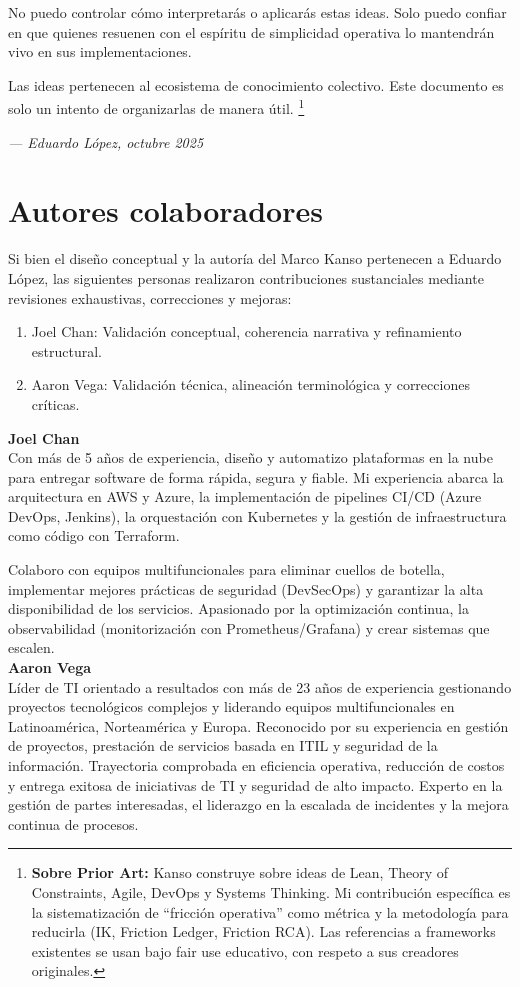 No puedo controlar cómo interpretarás o aplicarás estas ideas. Solo puedo confiar en que quienes resuenen con el espíritu de simplicidad operativa lo mantendrán vivo en sus implementaciones.

Las ideas pertenecen al ecosistema de conocimiento colectivo. Este documento es solo un intento de organizarlas de manera útil.
\footnote{%
\textbf{Sobre Prior Art:} Kanso construye sobre ideas de Lean, Theory of Constraints, 
Agile, DevOps y Systems Thinking. Mi contribución específica es la sistematización de 
``fricción operativa'' como métrica y la metodología para reducirla (IK, Friction Ledger, 
Friction RCA). Las referencias a frameworks existentes se usan bajo fair use educativo, 
con respeto a sus creadores originales.
}


\begin{flushright}
\textit{— Eduardo López, octubre 2025}
\end{flushright}


\section{Autores colaboradores}
Si bien el diseño conceptual y la autoría del Marco Kanso pertenecen a Eduardo López, las siguientes personas realizaron contribuciones sustanciales mediante revisiones exhaustivas, correcciones y mejoras:

\begin{enumerate}
    \item Joel Chan: Validación conceptual, coherencia narrativa y refinamiento estructural.
    \item Aaron Vega: Validación técnica, alineación terminológica y correcciones críticas.
\end{enumerate}

\textbf{Joel Chan}\\
Con más de 5 años de experiencia, diseño y automatizo plataformas en la nube para entregar software de forma rápida, 
segura y fiable. Mi experiencia abarca la arquitectura en AWS y Azure, la implementación de pipelines CI/CD 
(Azure DevOps, Jenkins), la orquestación con Kubernetes y la gestión de infraestructura como código con Terraform.

Colaboro con equipos multifuncionales para eliminar cuellos de botella, implementar mejores prácticas de seguridad 
(DevSecOps) y garantizar la alta disponibilidad de los servicios. Apasionado por la optimización continua, 
la observabilidad (monitorización con Prometheus/Grafana) y crear sistemas que escalen.
\\

\textbf{Aaron Vega}\\
Líder de TI orientado a resultados con más de 23 años de experiencia gestionando proyectos tecnológicos complejos 
y liderando equipos multifuncionales en Latinoamérica, Norteamérica y Europa. Reconocido por su experiencia en 
gestión de proyectos, prestación de servicios basada en ITIL y seguridad de la información. 
Trayectoria comprobada en eficiencia operativa, reducción de costos y entrega exitosa de iniciativas de TI y 
seguridad de alto impacto. Experto en la gestión de partes interesadas, el liderazgo en la escalada de incidentes y 
la mejora continua de procesos.